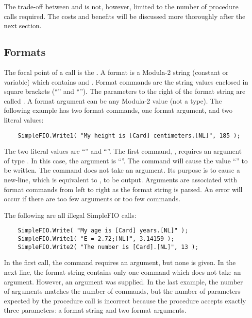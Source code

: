 The trade-off between  and  is
not, however, limited to the number of procedure calls required.  The costs 
and benefits
will be discussed more thoroughly after the next section.

\subsection{Formats}

The focal point of a  call is the .
A format is a Modula-2 string (constant or variable) which contains
 and  .  
Format commands are the string values
enclosed in square brackets (``\code{[}'' and  ``\code{]}'').  The 
parameters to the
right of the format string are called .
A format argument can be any Modula-2 value (not a type).  The following
example has two format commands, one format argument, and 
two literal values:
\begin{verbatim}
    SimpleFIO.Write1( "My height is [Card] centimeters.[NL]", 185 );
\end{verbatim}    
The two literal values are ``'' 
and ``''.
The first command, \code{[Card]}, requires an argument of type 
.
In this case, the argument is ``''.  The command will cause the
value ``'' to be written.
The \code{[NL]} command
does not take an argument.  Its purpose is to cause a new-line, 
which is equivalent to , to be output.
Arguments are associated with format commands from left to right as the format
string is parsed.  An error will occur if there are too few arguments or
too few commands. 

The following are all illegal SimpleFIO calls:
\begin{verbatim}
    SimpleFIO.Write( "My age is [Card] years.[NL]" );
    SimpleFIO.Write1( "E = 2.72;[NL]", 3.14159 );
    SimpleFIO.Write2( "The number is [Card].[NL]", 13 );
\end{verbatim}    
In the first call, the command \code{[Card]} requires an argument, but none
is given.  In the next line, the format string contains only one command
\code{[NL]} which does not take an argument.  However, an argument was 
supplied.
In the last example, the number of arguments matches the number of commands,
but the number of parameters expected by the procedure call is incorrect
because the procedure  accepts exactly three parameters: a format 
string and two format arguments.  


